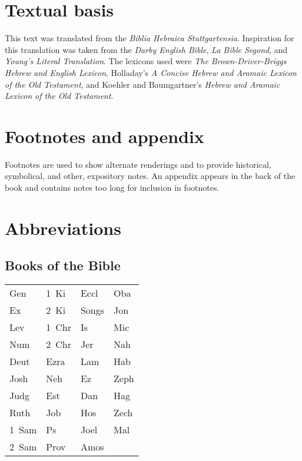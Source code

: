\section{Textual basis}
This text was translated from the \textit{Biblia Hebraica Stuttgartensia}. Inspiration for this translation was taken from the \textit{Darby English Bible}, \textit{La Bible Segond}, and \textit{Young's Literal Translation}. The lexicons used were \textit{The Brown-Driver-Briggs Hebrew and English Lexicon}, Holladay's \textit{A Concise Hebrew and Aramaic Lexicon of the Old Testament}, and Koehler and Baumgartner's \textit{Hebrew and Aramaic Lexicon of the Old Testament}.

\section{Footnotes and appendix}
Footnotes are used to show alternate renderings and to provide historical, symbolical, and other, expository notes. An appendix appears in the back of the book and contains notes too long for inclusion in footnotes.

\section{Abbreviations}
\subsection{Books of the Bible}
\begin{table}[!h]
    \centering
    \setlength\tabcolsep{1.75em}
    \begin{tabular}{llll}
        Gen   & 1~Ki  & Eccl  & Oba  \\
        Ex    & 2~Ki  & Songs & Jon  \\
        Lev   & 1~Chr & Is    & Mic  \\
        Num   & 2~Chr & Jer   & Nah  \\
        Deut  & Ezra  & Lam   & Hab  \\
        Josh  & Neh   & Ez    & Zeph \\
        Judg  & Est   & Dan   & Hag  \\
        Ruth  & Job   & Hos   & Zech \\
        1~Sam & Ps    & Joel  & Mal  \\
        2~Sam & Prov  & Amos  & ~
    \end{tabular}
\end{table}

